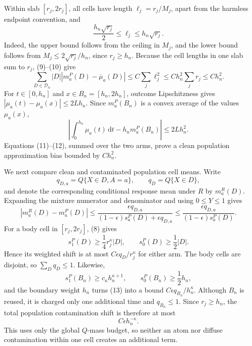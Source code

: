 Within slab \([r_j,2r_j]\), all cells have length \(\ell_j=r_j/M_j\), apart from the harmless endpoint convention, and
\[
\frac{h_n\sqrt{r_j}}2\leq\ell_j\leq h_n\sqrt{r_j}.
\tag{10}
\]
Indeed, the upper bound follows from the ceiling in \(M_j\), and the lower bound follows from \(M_j\leq2\sqrt{r_j}/h_n\), since \(r_j\geq h_n\). Because the cell lengths in one slab sum to \(r_j\), (9)--(10) give
\[
\sum_{D\in\mathcal D_n}|D|
|m_a^P(D)-\overline\mu_a(D)|
\leq C\sum_j\ell_j^2
\leq Ch_n^2\sum_jr_j
\leq Ch_n^2.
\tag{11}
\]
For \(t\in[0,h_n]\) and \(x\in B_n=[h_n,2h_n]\), outcome Lipschitzness gives \(|\mu_a(t)-\mu_a(x)|\leq2Lh_n\). Since \(m_a^P(B_n)\) is a convex average of the values \(\mu_a(x)\),
\[
\left|\int_0^{h_n}\mu_a(t)\,\mathrm dt-h_nm_a^P(B_n)\right|
\leq2Lh_n^2.
\tag{12}
\]
Equations (11)--(12), summed over the two arms, prove a clean population approximation bias bounded by \(Ch_n^2\).

We next compare clean and contaminated population cell means. Write
\[
q_{D,a}=Q\{X\in D,A=a\},
\qquad q_D=Q\{X\in D\},
\]
and denote the corresponding conditional response mean under \(R\) by \(m_a^R(D)\). Expanding the mixture numerator and denominator and using \(0\leq Y\leq1\) gives
\[
|m_a^R(D)-m_a^P(D)|
\leq\frac{\epsilon q_{D,a}}
{(1-\epsilon)s_a^P(D)+\epsilon q_{D,a}}
\leq\frac{\epsilon q_{D,a}}{(1-\epsilon)s_a^P(D)}.
\tag{13}
\]
For a body cell in \([r_j,2r_j]\), (8) gives
\[
s_1^P(D)\geq\frac14r_j^\kappa|D|,
\qquad
s_0^P(D)\geq\frac12|D|.
\]
Hence its weighted shift is at most \(C\epsilon q_D/r_j^\kappa\) for either arm. The body cells are disjoint, so \(\sum_Dq_D\leq1\). Likewise,
\[
s_1^P(B_n)\geq c_\kappa h_n^{\kappa+1},
\qquad
s_0^P(B_n)\geq\frac12h_n,
\]
and the boundary weight \(h_n\) turns (13) into a bound \(C\epsilon q_{B_n}/h_n^\kappa\). Although \(B_n\) is reused, it is charged only one additional time and \(q_{B_n}\leq1\). Since \(r_j\geq h_n\), the total population contamination shift is therefore at most
\[
C\epsilon h_n^{-\kappa}.
\tag{14}
\]
This uses only the global \(Q\)-mass budget, so neither an atom nor diffuse contamination within one cell creates an additional term.

